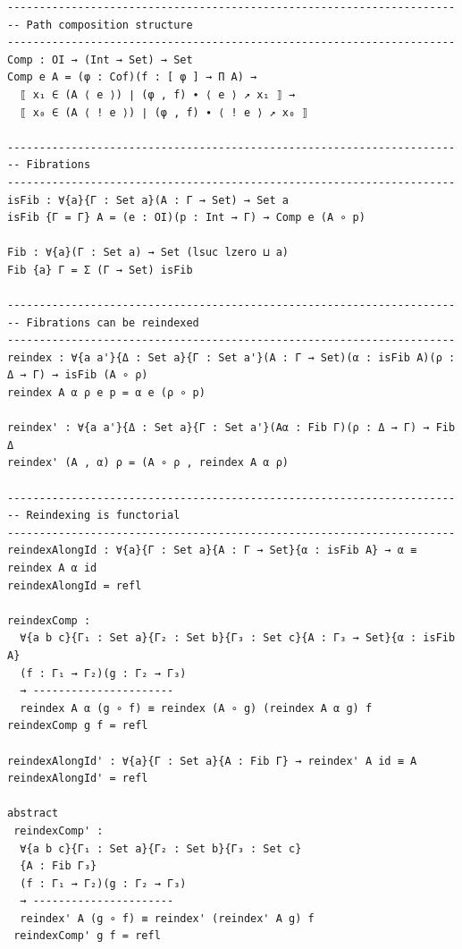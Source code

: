 \documentclass[aspectratio=169,xcolor=dvipsnames]{beamer}
\begin{document}
\begin{frame}
\begin{verbatim}
----------------------------------------------------------------------
-- Path composition structure
----------------------------------------------------------------------
Comp : OI → (Int → Set) → Set
Comp e A = (φ : Cof)(f : [ φ ] → Π A) →
  ⟦ x₁ ∈ (A ⟨ e ⟩) ∣ (φ , f) ∙ ⟨ e ⟩ ↗ x₁ ⟧ →
  ⟦ x₀ ∈ (A ⟨ ! e ⟩) ∣ (φ , f) ∙ ⟨ ! e ⟩ ↗ x₀ ⟧

----------------------------------------------------------------------
-- Fibrations
----------------------------------------------------------------------
isFib : ∀{a}{Γ : Set a}(A : Γ → Set) → Set a
isFib {Γ = Γ} A = (e : OI)(p : Int → Γ) → Comp e (A ∘ p)

Fib : ∀{a}(Γ : Set a) → Set (lsuc lzero ⊔ a)
Fib {a} Γ = Σ (Γ → Set) isFib

----------------------------------------------------------------------
-- Fibrations can be reindexed
----------------------------------------------------------------------
reindex : ∀{a a'}{Δ : Set a}{Γ : Set a'}(A : Γ → Set)(α : isFib A)(ρ : Δ → Γ) → isFib (A ∘ ρ)
reindex A α ρ e p = α e (ρ ∘ p)

reindex' : ∀{a a'}{Δ : Set a}{Γ : Set a'}(Aα : Fib Γ)(ρ : Δ → Γ) → Fib Δ
reindex' (A , α) ρ = (A ∘ ρ , reindex A α ρ)

----------------------------------------------------------------------
-- Reindexing is functorial
----------------------------------------------------------------------
reindexAlongId : ∀{a}{Γ : Set a}{A : Γ → Set}{α : isFib A} → α ≡ reindex A α id 
reindexAlongId = refl

reindexComp :
  ∀{a b c}{Γ₁ : Set a}{Γ₂ : Set b}{Γ₃ : Set c}{A : Γ₃ → Set}{α : isFib A}
  (f : Γ₁ → Γ₂)(g : Γ₂ → Γ₃)
  → ----------------------
  reindex A α (g ∘ f) ≡ reindex (A ∘ g) (reindex A α g) f
reindexComp g f = refl

reindexAlongId' : ∀{a}{Γ : Set a}{A : Fib Γ} → reindex' A id ≡ A
reindexAlongId' = refl

abstract
 reindexComp' :
  ∀{a b c}{Γ₁ : Set a}{Γ₂ : Set b}{Γ₃ : Set c}
  {A : Fib Γ₃}
  (f : Γ₁ → Γ₂)(g : Γ₂ → Γ₃)
  → ----------------------
  reindex' A (g ∘ f) ≡ reindex' (reindex' A g) f
 reindexComp' g f = refl
\end{verbatim}
\end{frame}
\end{document}
